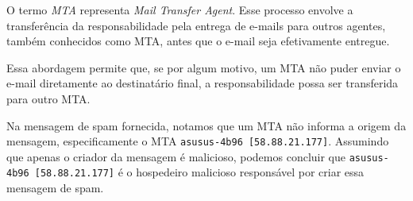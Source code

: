 \documentclass{homework}
\begin{document}
\begin{exercise}[P15)]
O termo \textit{MTA} representa \textit{Mail Transfer Agent}. Esse processo envolve a transferência da responsabilidade pela entrega de e-mails para outros agentes, também conhecidos como MTA, antes que o e-mail seja efetivamente entregue. 

Essa abordagem permite que, se por algum motivo, um MTA não puder enviar o e-mail diretamente ao destinatário final, a responsabilidade possa ser transferida para outro MTA.

Na mensagem de spam fornecida, notamos que um MTA não informa a origem da mensagem, especificamente o MTA \texttt{asusus-4b96 [58.88.21.177]}. Assumindo que apenas o criador da mensagem é malicioso, podemos concluir que \texttt{asusus-4b96 [58.88.21.177]} é o hospedeiro malicioso responsável por criar essa mensagem de spam.

\end{exercise}
\end{document}
